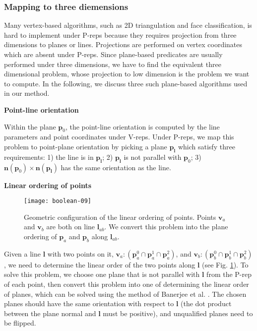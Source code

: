\subsubsection{Mapping to three diemensions}

Many vertex-based algorithms, such as 2D triangulation and face classification, is hard to implement under P-reps because they requires projection from three dimensions to planes or lines.  Projections are performed on vertex coordinates which are absent under P-reps. Since plane-based predicates \cite{bernstein2009fast,banerjee1996topologically} are usually performed under three dimensions, we have to find the equivalent three dimensional problem, whose projection to low dimension is the problem we want to compute. In the following, we discuss three such plane-based algorithms used in our method.

\vspace{0.5em}
\noindent \textbf{Point-line orientation}

\noindent Within the plane $\bm{p}_0$, the point-line orientation is computed by the line parameters and point coordinates under V-reps. Under P-reps, we map this problem to point-plane orientation by picking a plane $\bm{p_l}$ which satisfy three requirements: 1) the line is in $\bm{p_l}$; 2) $\bm{p_l}$ is not parallel with $\bm{p}_0$; 3) $\bm{n}(\bm{p}_0) \times \bm{n}(\bm{p_l})$ has the same orientation as the line.

\vspace{0.5em}
\noindent \textbf{Linear ordering of points}

\begin{figure}
  \centering
  \texttt{[image: boolean-09]}\\
  \caption{Geometric configuration of the linear ordering of points. Points $\bm{v}_a$ and $\bm{v}_b$ are both on line $\bm{l}_{ab}$. We convert this problem into the plane ordering of $\bm{p}_a$ and $\bm{p}_b$ along $\bm{l}_{ab}$.}\label{fig:twopointoneline}
\end{figure}

\noindent Given a line $\bm{l}$ with two points on it, $\bm{v}_a\colon(\bm{p}_a^0\cap\bm{p}_a^1\cap\bm{p}_a^2)$, and $\bm{v}_b\colon(\bm{p}_b^0\cap\bm{p}_b^1\cap\bm{p}_b^2)$, we need to determine the linear order of the two points along $\bm{l}$ (see Fig. \ref{fig:twopointoneline}).
To solve this problem, we choose one plane that is not parallel with $\bm{l}$ from the P-rep of each point, then convert this problem into one of determining the linear order of planes, which can be solved using the method of Banerjee et al. \cite{banerjee1996topologically}. The chosen planes should have the same orientation with respect to $\bm{l}$ (the dot product between the plane normal and $\bm{l}$ must be positive), and unqualified planes need to be flipped.


